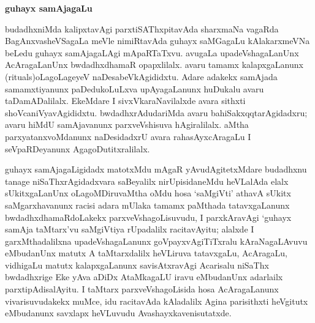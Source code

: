 \smallskip
\begin{center}
{\Large\bf guhayx samAjagaLu}
\end{center}

budadhxniMda kalipxtavAgi parxtiSAThxpitavAda sharxmaNa vagaRda BagAnxvasheVSagaLa meVle nimiRtavAda guhayx saMGagaLu kAlakarxmeVNa beLedu guhayx samAjagaLAgi mApaRTaTxvu. avugaLa upadeVshagaLanUnx AcAragaLanUnx bwdadhxdhamaR opapxlilalx. avaru tamamx kalapxgaLanunx {\rm(rituals)}oLagoLageyeV naDesabeVkAgididxtu. Adare adakekx samAjada samamxtiyanunx paDedukoLuLxva upAyagaLanunx huDukalu avaru taDamADalilalx. EkeMdare I sivxVkaraNavilalxde avara sithxti shoVcaniVyavAgididxtu. bwdadhxrAdudariMda avaru bahiSakxqqtarAgidadxru; avaru hiMdU samAjavanunx parxveVshisuva hAgiralilalx. aMtha parxyatanxvoMdanunx naDesidadxrU avara rahasAyxcAragaLu I seVpaRDeyanunx AgagoDutitxralilalx.

guhayx samAjagaLigidadx matotxMdu mAgaR yAvudAgitetxMdare budadhxnu tanage niSaThxrAgidadxvara saBeyalilx nirUpisidaneMdu heVLalAda elalx sUkitxgaLanUnx oLagoMDiruvaMtha oMdu hosa `saMgiVti' athavA sUkitx saMgarxhavanunx racisi adara mUlaka tamamx paMthada tatavxgaLanunx bwdadhxdhamaRdoLakekx parxveVshagoLisuvudu, I parxkAravAgi `guhayx samAja taMtarx'vu saMgiVtiya rUpadalilx racitavAyitu; alalxde I garxMthadalilxna upadeVshagaLanunx goVpayxvAgiTiTxralu kAraNagaLAvuvu eMbudanUnx matutx A taMtarxdalilx heVLiruva tatavxgaLu, AcAragaLu, vidhigaLu matutx kalapxgaLanunx savisAtxravAgi Acarisalu niSaThx bwdadhxrige Eke yAva aDiDx AtaMkagaLU iravu eMbudanUnx adarlailx parxtipAdisalAyitu. I taMtarx parxveVshagoLisida hosa AcAragaLanunx vivarisuvudakekx muMce, idu racitavAda kAladalilx Agina parisithxti heVgitutx eMbudanunx savxlapx heVLuvudu Avashayxkavenisutatxde.

